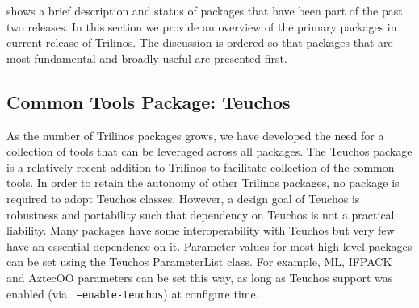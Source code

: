 \documentclass[acmtoms,acmnow]{acmtrans2m}
\begin{document}
shows a brief description and status of packages that have been part
of the past two releases.  
In this section we provide an overview of the primary packages in
current release of Trilinos.  The discussion is ordered so that
packages that are most fundamental and broadly useful are presented
first.
\subsection{Common Tools Package: Teuchos}

As the number of Trilinos packages grows, we have developed the need
for a collection of tools that can be leveraged across all
packages.  The Teuchos package is a relatively recent addition to
Trilinos to facilitate collection of the common tools.  In order to
retain the autonomy of other Trilinos packages, no package is required
to adopt Teuchos classes.  However, a design goal of
Teuchos is robustness and portability such that dependency on Teuchos
is not a practical liability.  Many packages have some
interoperability with Teuchos but very few have an essential
dependence on it.  Parameter values for 
most high-level packages can be set using the Teuchos ParameterList
class.  For example, ML, IFPACK and AztecOO parameters can be set this
way, as long as Teuchos support was enabled (via {\tt
--enable-teuchos}) at configure time.
\end{document}
